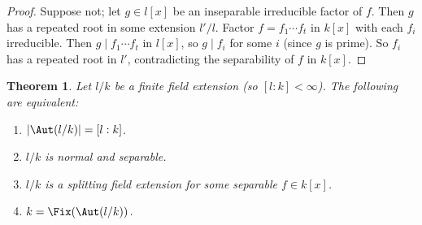 \documentclass[a4paper,12pt]{article}
\newtheorem{thm}{Theorem}[section]
\begin{document}
\begin{proof}
    Suppose not; let $g\in l[x]$ be an inseparable irreducible factor of $f$. Then $g$ has a repeated root in some extension $l'/l$. Factor $f=f_1\cdots f_t$ in $k[x]$ with each $f_i$ irreducible. Then $g\mid f_1\cdots f_t$ in $l[x]$, so $g\mid f_i$ for some $i$ (since $g$ is prime). So $f_i$ has a repeated root in $l'$, contradicting the separability of $f$ in $k[x]$.
\end{proof}
\begin{thm}
    Let $l/k$ be a finite field extension (so $[l:k]<\infty$). The following are equivalent:
    \begin{enumerate}
        \item $|\Aut(l/k)|=[l:k]$.
        \item $l/k$ is normal and separable.
        \item $l/k$ is a splitting field extension for some separable $f\in k[x]$.
        \item $k=\Fix(\Aut(l/k))$.
    \end{enumerate}
\end{thm}
\end{document}
